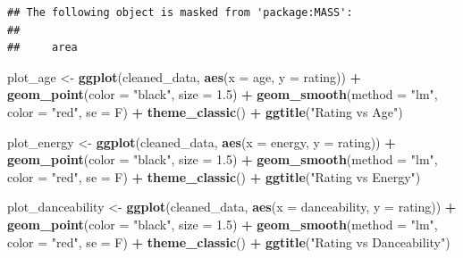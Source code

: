\documentclass[
]{article}
\newenvironment{Shaded}{\begin{snugshade}}{\end{snugshade}}
\newcommand{\AttributeTok}[1]{\textcolor[rgb]{0.13,0.29,0.53}{#1}}
\newcommand{\FloatTok}[1]{\textcolor[rgb]{0.00,0.00,0.81}{#1}}
\newcommand{\FunctionTok}[1]{\textcolor[rgb]{0.13,0.29,0.53}{\textbf{#1}}}
\newcommand{\NormalTok}[1]{#1}
\newcommand{\OtherTok}[1]{\textcolor[rgb]{0.56,0.35,0.01}{#1}}
\newcommand{\SpecialCharTok}[1]{\textcolor[rgb]{0.81,0.36,0.00}{\textbf{#1}}}
\newcommand{\StringTok}[1]{\textcolor[rgb]{0.31,0.60,0.02}{#1}}
\begin{document}
\begin{verbatim}
## The following object is masked from 'package:MASS':
## 
##     area
\end{verbatim}

\begin{Shaded}
\begin{Highlighting}[]
\NormalTok{plot\_age }\OtherTok{\textless{}{-}} \FunctionTok{ggplot}\NormalTok{(cleaned\_data, }\FunctionTok{aes}\NormalTok{(}\AttributeTok{x =}\NormalTok{ age, }\AttributeTok{y =}\NormalTok{ rating)) }\SpecialCharTok{+}
  \FunctionTok{geom\_point}\NormalTok{(}\AttributeTok{color =} \StringTok{"black"}\NormalTok{, }\AttributeTok{size =} \FloatTok{1.5}\NormalTok{) }\SpecialCharTok{+}
  \FunctionTok{geom\_smooth}\NormalTok{(}\AttributeTok{method =} \StringTok{"lm"}\NormalTok{, }\AttributeTok{color =} \StringTok{"red"}\NormalTok{, }\AttributeTok{se =}\NormalTok{ F) }\SpecialCharTok{+}
  \FunctionTok{theme\_classic}\NormalTok{() }\SpecialCharTok{+}
  \FunctionTok{ggtitle}\NormalTok{(}\StringTok{"Rating vs Age"}\NormalTok{)}

\NormalTok{plot\_energy }\OtherTok{\textless{}{-}} \FunctionTok{ggplot}\NormalTok{(cleaned\_data, }\FunctionTok{aes}\NormalTok{(}\AttributeTok{x =}\NormalTok{ energy, }\AttributeTok{y =}\NormalTok{ rating)) }\SpecialCharTok{+}
  \FunctionTok{geom\_point}\NormalTok{(}\AttributeTok{color =} \StringTok{"black"}\NormalTok{, }\AttributeTok{size =} \FloatTok{1.5}\NormalTok{) }\SpecialCharTok{+}
  \FunctionTok{geom\_smooth}\NormalTok{(}\AttributeTok{method =} \StringTok{"lm"}\NormalTok{, }\AttributeTok{color =} \StringTok{"red"}\NormalTok{, }\AttributeTok{se =}\NormalTok{ F) }\SpecialCharTok{+}
  \FunctionTok{theme\_classic}\NormalTok{() }\SpecialCharTok{+}
  \FunctionTok{ggtitle}\NormalTok{(}\StringTok{"Rating vs Energy"}\NormalTok{)}

\NormalTok{plot\_danceability }\OtherTok{\textless{}{-}} \FunctionTok{ggplot}\NormalTok{(cleaned\_data, }\FunctionTok{aes}\NormalTok{(}\AttributeTok{x =}\NormalTok{ danceability, }\AttributeTok{y =}\NormalTok{ rating)) }\SpecialCharTok{+}
  \FunctionTok{geom\_point}\NormalTok{(}\AttributeTok{color =} \StringTok{"black"}\NormalTok{, }\AttributeTok{size =} \FloatTok{1.5}\NormalTok{) }\SpecialCharTok{+}
  \FunctionTok{geom\_smooth}\NormalTok{(}\AttributeTok{method =} \StringTok{"lm"}\NormalTok{, }\AttributeTok{color =} \StringTok{"red"}\NormalTok{, }\AttributeTok{se =}\NormalTok{ F) }\SpecialCharTok{+}
  \FunctionTok{theme\_classic}\NormalTok{() }\SpecialCharTok{+}
  \FunctionTok{ggtitle}\NormalTok{(}\StringTok{"Rating vs Danceability"}\NormalTok{)}


\end{Highlighting}
\end{Shaded}
\end{document}
